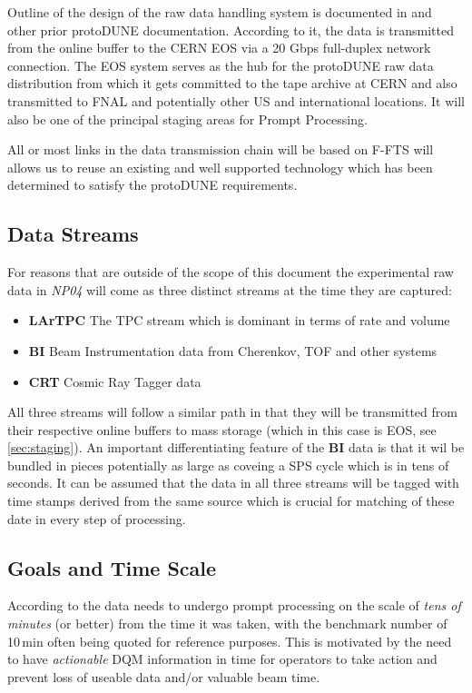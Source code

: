 \documentclass[pdftex,12pt,letter]{article}
\newcommand{\pd}{protoDUNE\xspace}
\newcommand{\expname}{\textit{NP04}\xspace}
\newcommand{\PP}{Prompt Processing\xspace}
\begin{document}
Outline of the design of the raw data handling system is documented in  \cite{docdb1212} and other prior \pd documentation.
According to it, the data is transmitted from the online buffer to the CERN EOS \cite{eos}
via a 20 Gbps full-duplex network connection.
The EOS system serves as the hub for the \pd raw data distribution from which
it gets committed to the tape archive at CERN and also transmitted to FNAL and potentially
other US and international locations.  It will also be one of the principal staging areas for \PP. 

All or most links in the data transmission chain will be based on F-FTS \cite{fts} will allows us
to reuse an existing and well supported technology which has been determined to satisfy
the \pd requirements.

\subsection{Data Streams}
\label{sec:streams}

For reasons that are outside of the scope of this document  the experimental raw data in \expname
will come as three distinct streams at the time they are captured:
\begin{itemize}
\item \textbf{LArTPC} The TPC  stream which is dominant in terms of rate and volume
\item \textbf{BI} Beam Instrumentation data from Cherenkov, TOF and other systems
\item \textbf{CRT} Cosmic Ray Tagger data
\end{itemize}

\noindent All three streams will follow a similar path in that they will be transmitted from their respective
online buffers to mass storage (which in this case is EOS, see \ref{sec:staging}). An important differentiating
feature of the \textbf{BI} data is that it wil be bundled in pieces potentially as large as coveing
a SPS cycle which is in tens of seconds. It can be assumed that the data in all three streams will be tagged
with time stamps derived from the same source which is crucial for matching of these date in every step
of processing.

\subsection{Goals and Time Scale}
\label{sec:outline}
According to \cite{docdb1811}  the data needs to undergo prompt processing on the scale
of \textit{tens of minutes} (or better) from the time it was taken, with the benchmark number of
10\,min often being quoted for reference purposes. This is motivated by the need to have
\textit{actionable} DQM information in time for operators to take action and prevent loss
of useable data and/or valuable beam time.
\end{document}
